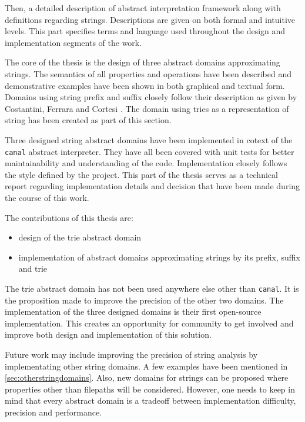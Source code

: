 \documentclass[12pt,final,oneside]{fithesis2}
\theoremstyle{definition}
\begin{document}
Then, a detailed description of abstract interpretation framework
along with definitions regarding strings. Descriptions are given on both
formal and intuitive levels. This part specifies terms and language used
throughout the design and implementation segments of the work.

The core of the thesis is the design of three abstract domains
approximating strings. The semantics of all properties and operations
have been described and demonstrative examples have been shown in both
graphical and textual form. Domains using string prefix and suffix
closely follow their description as given by Costantini, Ferrara and
Cortesi \cite{Constantini11-1}. The domain using tries as a representation
of string has been created as part of this section.

Three designed string abstract domains have been implemented in cotext of
the \texttt{canal} abstract interpreter. They have all been covered with
unit tests for better maintainability and understanding of the code.
Implementation closely follows the style defined by the project. This
part of the thesis serves as a technical report regarding implementation
details and decision that have been made during the course of this work.

The contributions of this thesis are:

\begin{itemize}

\item design of the trie abstract domain

\item implementation of abstract domains approximating strings by its
prefix, suffix and trie

\end{itemize}

The trie abstract domain has not been used anywhere else other than
\texttt{canal}. It is the proposition made to improve the precision of the
other two domains. The implementation of the three designed domains is
their first open-source implementation. This creates an opportunity for
community to get involved and improve both design and implementation of this
solution.

Future work may include improving the precision of string analysis by
implementating other string domains. A few examples have been mentioned
in \ref{sec:otherstringdomains}. Also, new domains for strings can be
proposed where properties other than filepaths will be considered. However,
one needs to keep in mind that every abstract domain is a tradeoff between
implementation difficulty, precision and performance.
\end{document}
